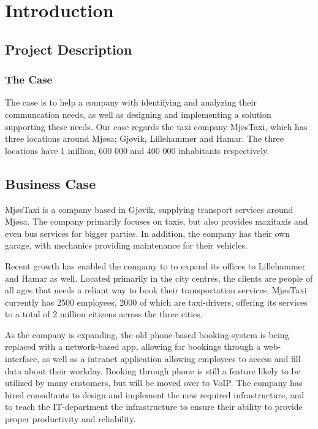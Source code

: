 \chapter{Introduction}
\label{chap:introduction}

\section{Project Description}

\subsection{The Case}
The case is to help a company with identifying and analyzing their communcation needs, as well as designing and implementing a solution supporting these needs. 
Our case regards the taxi company MjøsTaxi, which has three locations around Mjøsa; Gjøvik, Lillehammer and Hamar.
The three locations have 1 million, 600 000 and 400 000 inhabitants respectively.


\section{Business Case}
MjøsTaxi is a company based in Gjøvik, supplying transport services around Mjøsa. 
The company primarily focuses on taxis, but also provides maxitaxis and even bus services for bigger parties.
In addition, the company has their own garage, with mechanics providing maintenance for their vehicles.

Recent growth has enabled the company to to expand its offices to Lillehammer and Hamar as well. 
Located primarily in the city centres, the clients are people of all ages that needs a reliant way to book their transportation services.
MjøsTaxi currently has 2500 employees, 2000 of which are taxi-drivers, offering its services to a total of 2 million citizens across the three cities.

As the company is expanding, the old phone-based booking-system is being replaced with a network-based app, allowing for bookings through a web-interface, as well as a intranet application allowing employees to access and fill data about their workday. %
Booking through phone is still a feature likely to be utilized by many customers, but will be moved over to VoIP.
The company has hired consultants to design and implement the new required infrastructure, and to teach the IT-department the infrastructure to ensure their ability to provide proper productivity and reliability.

